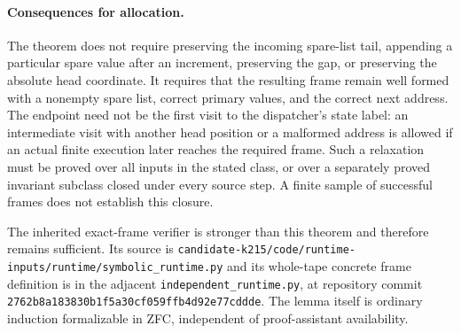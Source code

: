 \paragraph{Consequences for allocation.}
The theorem does not require preserving the incoming spare-list tail,
appending a particular spare value after an increment, preserving the
gap, or preserving the absolute head coordinate. It requires that the
resulting frame remain well formed with a nonempty spare list, correct
primary values, and the correct next address. The endpoint need not be
the first visit to the dispatcher's state label: an intermediate visit
with another head position or a malformed address is allowed if an
actual finite execution later reaches the required frame. Such a
relaxation must be proved over all inputs in the stated class, or over
a separately proved invariant subclass closed under every source step.
A finite sample of successful frames does not establish this closure.

The inherited exact-frame verifier is stronger than this theorem and
therefore remains sufficient. Its source is
\texttt{candidate-k215/code/runtime-inputs/runtime/symbolic\_runtime.py}
and its whole-tape concrete frame definition is in the adjacent
\texttt{independent\_runtime.py}, at repository commit
\texttt{2762b8a183830b1f5a30cf059ffb4d92e77cddde}. The lemma itself is
ordinary induction formalizable in ZFC, independent of proof-assistant
availability.
